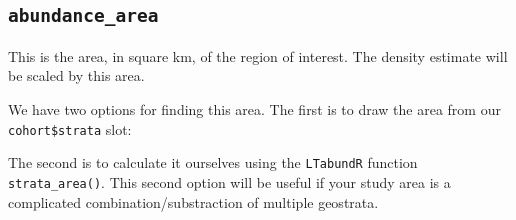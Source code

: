 \documentclass[
]{book}
\newenvironment{Shaded}{\begin{snugshade}}{\end{snugshade}}
\newcommand{\AttributeTok}[1]{\textcolor[rgb]{0.13,0.29,0.53}{#1}}
\newcommand{\DecValTok}[1]{\textcolor[rgb]{0.00,0.00,0.81}{#1}}
\newcommand{\FunctionTok}[1]{\textcolor[rgb]{0.13,0.29,0.53}{\textbf{#1}}}
\newcommand{\NormalTok}[1]{#1}
\newcommand{\OtherTok}[1]{\textcolor[rgb]{0.56,0.35,0.01}{#1}}
\newcommand{\SpecialCharTok}[1]{\textcolor[rgb]{0.81,0.36,0.00}{\textbf{#1}}}
\newcommand{\StringTok}[1]{\textcolor[rgb]{0.31,0.60,0.02}{#1}}
\begin{document}
\hypertarget{abundance_area}{%
\subsection*{\texorpdfstring{\texttt{abundance\_area}}{abundance\_area}}\label{abundance_area}}

This is the area, in square km, of the region of interest. The density estimate will be scaled by this area.

We have two options for finding this area. The first is to draw the area from our \texttt{cohort\$strata} slot:

\begin{Shaded}
\end{Shaded}

The second is to calculate it ourselves using the \texttt{LTabundR} function \texttt{strata\_area()}. This second option will be useful if your study area is a complicated combination/substraction of multiple geostrata.

\begin{Shaded}
\end{Shaded}
\end{document}
